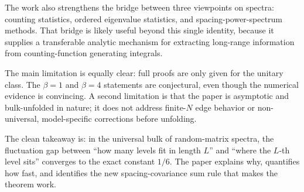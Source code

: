 \documentclass[11pt]{article}
\begin{document}
The work also strengthens the bridge between three viewpoints on spectra: counting statistics, ordered eigenvalue statistics, and spacing-power-spectrum methods. That bridge is likely useful beyond this single identity, because it supplies a transferable analytic mechanism for extracting long-range information from counting-function generating integrals.

The main limitation is equally clear: full proofs are only given for the unitary class. The $\beta=1$ and $\beta=4$ statements are conjectural, even though the numerical evidence is convincing. A second limitation is that the paper is asymptotic and bulk-unfolded in nature; it does not address finite-$N$ edge behavior or non-universal, model-specific corrections before unfolding.

The clean takeaway is: in the universal bulk of random-matrix spectra, the fluctuation gap between ``how many levels fit in length $L$'' and ``where the $L$-th level sits'' converges to the exact constant $1/6$. The paper explains why, quantifies how fast, and identifies the new spacing-covariance sum rule that makes the theorem work.
\end{document}
